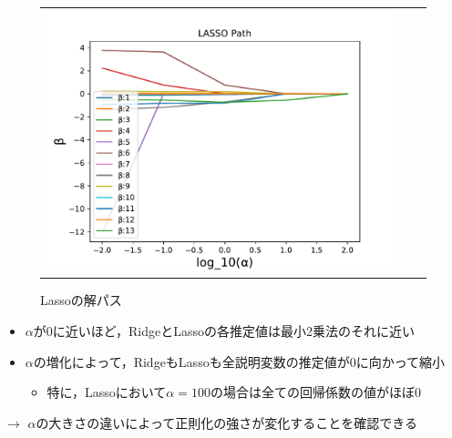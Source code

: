\documentclass[dvipdfmx, 10pt]{beamer}
\begin{document}
\begin{frame}{\insertsubsection}
\begin{figure}[H]
\begin{tabular}{ccc}
\begin{minipage}{0.33\hsize}
            		 \caption{Ridgeの解パス}
            		 \label{fig:ridge}
            	 \end{minipage}
            	 \begin{minipage}{0.33\hsize}
                   	 \includegraphics[width=1.0\linewidth]{../img/lassoPath.pdf}
            		 \caption{Lassoの解パス}
            		 \label{fig:lasso}
            	 \end{minipage}
    	     \end{tabular}
    \end{figure}
    \begin{itemize}
        \item $\alpha$が0に近いほど，RidgeとLassoの各推定値は最小2乗法のそれに近い
        \item $\alpha$の増化によって，RidgeもLassoも全説明変数の推定値が0に向かって縮小
         \begin{itemize}
            \item 特に，Lassoにおいて$\alpha=100$の場合は全ての回帰係数の値がほぼ0
         \end{itemize}
    \end{itemize}
    $\rightarrow$ $\alpha$の大きさの違いによって正則化の強さが変化することを確認できる
\end{frame}
\end{document}
